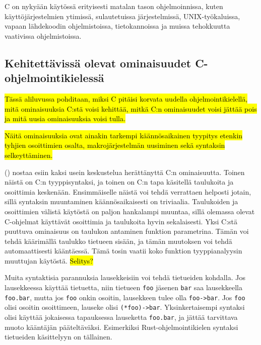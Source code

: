 C on nykyään käytössä erityisesti matalan tason ohjelmoinnissa, kuten
käyttöjärjestelmien ytimissä, sulautetuissa järjestelmissä, UNIX-työkaluissa,
vapaan lähdekoodin ohjelmistoissa, tietokannoissa ja muissa tehokkuutta
vaativissa ohjelmistoissa.

\subsection{Kehitettävissä olevat ominaisuudet C-ohjelmointikielessä}

\hl{Tässä aliluvussa pohditaan, miksi C pitäisi korvata uudella
ohjelmointikielellä, mitä ominaisuuksia C:stä voisi kehittää, mitkä C:n
ominaisuudet voisi jättää pois ja mitä uusia ominaisuuksia voisi tulla.}

\hl{Näitä ominaisuuksia ovat ainakin tarkempi käännösaikainen tyypitys etenkin
tyhjien osoittimien osalta, makrojärjestelmän uusiminen sekä syntaksin
selkeyttäminen.}

\citeauthor{chistory} (\citeyear{chistory}) nostaa esiin kaksi usein
keskustelua herättänyttä C:n ominaisuutta. Toinen näistä on C:n tyyppisyntaksi,
ja toinen on C:n tapa käsitellä taulukoita ja osoittimia keskenään.
Ensimmäiselle näistä voi tehdä verrattaen helposti jotain, sillä syntaksin
muuntaminen käännösaikaisesti on triviaalia. Taulukoiden ja osoittimien välistä
käytöstä on paljon hankalampi muuntaa, sillä olemassa olevat C-ohjelmat
käyttävät osoittimia ja taulukoita hyvin sekalaisesti. Yksi C:stä puuttuva
ominaisuus on taulukon antaminen funktion parametrina. Tämän voi tehdä
käärimällä taulukko tietueen sisään, ja tämän muutoksen voi tehdä
automaattisesti kääntäessä. Tämä tosin vaatii koko funktion tyyppianalyysin
muuttujan käytöstä. \hl{Selitys?}

Muita syntaktisia parannuksia lausekkeisiin voi tehdä tietueiden kohdalla. Jos
lausekkeessa käyttää tietuetta, niin tietueen \texttt{foo} jäsenen \texttt{bar}
saa lausekkeella \texttt{foo.bar}, mutta jos \texttt{foo} onkin osoitin,
lausekkeen tulee olla \texttt{foo->bar}. Jos \texttt{foo} olisi osoitin
osoittimeen, lauseke olisi \texttt{(*foo)->bar}. Yksinkertaisempi syntaksi
olisi käyttää jokaisessa tapauksessa lauseketta \texttt{foo.bar}, ja jättää
tarvittava muoto kääntäjän pääteltäväksi. Esimerkiksi Rust-ohjelmointikielen
syntaksi tietueiden käsittelyyn on tällainen.

